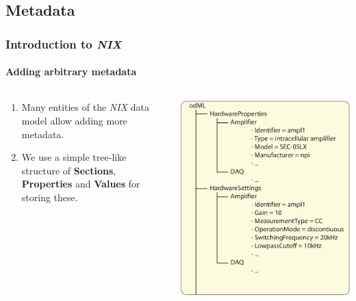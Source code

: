 \documentclass[pdftex, xcolor=table]{beamer}
\newcommand{\nix}{\textit{NIX}}
\begin{document}
\subsection{Metadata}
\begin{frame}
  \frametitle{Introduction to \nix{}}
  \framesubtitle{Adding arbitrary metadata}
  \begin{columns}
    \begin{column}{6.5cm}
      \begin{enumerate}
      \item Many entities of the \nix{} data model allow adding more metadata.
      \item We use a simple tree-like structure of \textbf{Sections},
        \textbf{Properties} and \textbf{Values} for storing these.
      \end{enumerate}
    \end{column}
    \begin{column}{5cm}
      \begin{center}
        \includegraphics[width=\columnwidth]{images/metadata.pdf}
      \end{center}
    \end{column}
  \end{columns}
\end{frame}
\end{document}

